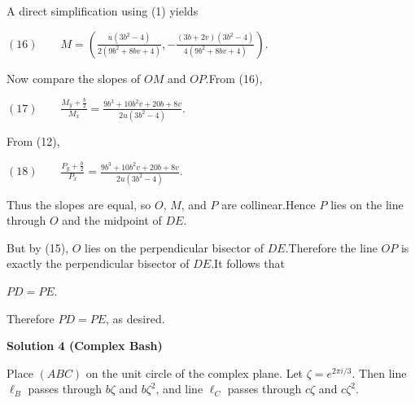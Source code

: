 \begin{enumerate}
 A direct simplification using (1) yields

 $(16)\qquad M=\left( \frac{u(3b^2-4)}{2(9b^2+8bv+4)}, -\frac{(3b+2v)(3b^2-4)}{4(9b^2+8bv+4)} \right).$

 Now compare the slopes of $OM$ and $OP$.From (16),

 $(17)\qquad \frac{M_y+\frac b2}{M_x} = \frac{9b^3+10b^2v+20b+8v}{2u(3b^2-4)}.$

 From (12),

 $(18)\qquad \frac{P_y+\frac b2}{P_x} = \frac{9b^3+10b^2v+20b+8v}{2u(3b^2-4)}.$

 Thus the slopes are equal, so $O$, $M$, and $P$ are collinear.Hence $P$ lies on the line through $O$ and the midpoint of $DE$.

 But by (15), $O$ lies on the perpendicular bisector of $DE$.Therefore the line $OP$ is exactly the perpendicular bisector of $DE$.It follows that

 $PD=PE$.

 Therefore $PD=PE$, as desired.

 


 



\textbf{Solution 4 (Complex Bash)}

Place $(ABC)$ on the unit circle of the complex plane. Let $\zeta = e^{2\pi i/3}$. Then line $\ell_B$ passes through $b\zeta$ and $b\zeta^2$, and line $\ell_C$ passes through $c\zeta$ and $c\zeta^2$.


\end{enumerate}
